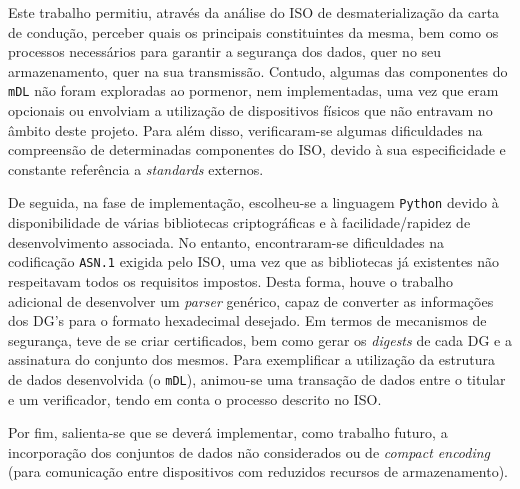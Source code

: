 
Este trabalho permitiu, através da análise do ISO de desmaterialização da carta de condução, perceber quais os principais constituintes da mesma, bem como os processos necessários para garantir a segurança dos dados, quer no seu armazenamento, quer na sua transmissão. Contudo, algumas das componentes do \texttt{mDL} não foram exploradas ao pormenor, nem implementadas, uma vez que eram opcionais ou envolviam a utilização de dispositivos físicos que não entravam no âmbito deste projeto. Para além disso, verificaram-se algumas dificuldades na compreensão de determinadas componentes do ISO, devido à sua especificidade e constante referência a \textit{standards} externos.

De seguida, na fase de implementação, escolheu-se a linguagem \texttt{Python} devido à disponibilidade de várias bibliotecas criptográficas e à facilidade/rapidez de desenvolvimento associada. No entanto, encontraram-se dificuldades na codificação \texttt{ASN.1} exigida pelo ISO, uma vez que as bibliotecas já existentes não respeitavam todos os requisitos impostos. Desta forma, houve o trabalho adicional de desenvolver um \textit{parser} genérico, capaz de converter as informações dos DG's para o formato hexadecimal desejado. Em termos de mecanismos de segurança, teve de se criar certificados, bem como gerar os \textit{digests} de cada DG e a assinatura do conjunto dos mesmos. Para exemplificar a utilização da estrutura de dados desenvolvida (o \texttt{mDL}), animou-se uma transação de dados entre o titular e um verificador, tendo em conta o processo descrito no ISO.

Por fim, salienta-se que se deverá implementar, como trabalho futuro, a incorporação dos conjuntos de dados não considerados ou de \textit{compact encoding} (para comunicação entre dispositivos com reduzidos recursos de armazenamento).